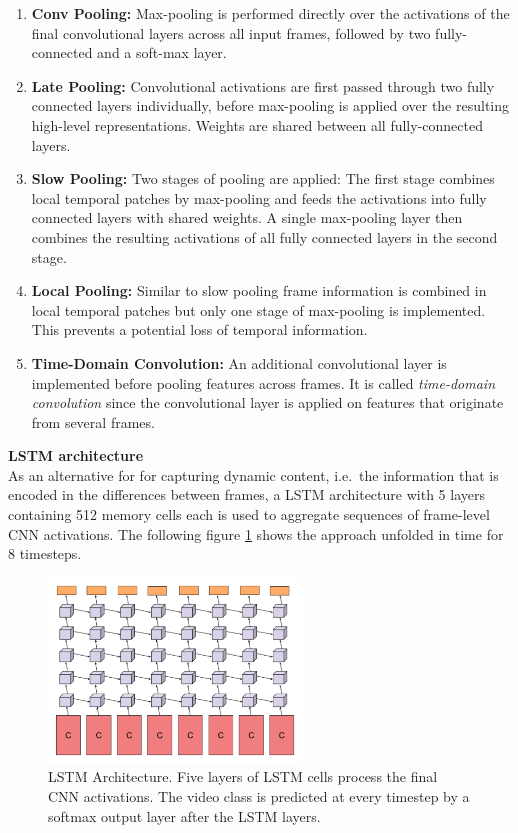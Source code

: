 \begin{enumerate}[label=\alph*)]
\item \textbf{Conv Pooling:} Max-pooling is performed directly over the activations of the final convolutional layers across all input frames, followed by two fully-connected and a soft-max layer.
\item \textbf{Late Pooling:} Convolutional activations are first passed through two fully connected layers individually, before max-pooling is applied over the resulting high-level representations. Weights are shared between all fully-connected layers.
\item \textbf{Slow Pooling:} Two stages of pooling are applied: The first stage combines local temporal patches by max-pooling and feeds the activations into fully connected layers with shared weights. A single max-pooling layer then combines the resulting activations of all fully connected layers in the second stage.
\item \textbf{Local Pooling:} Similar to slow pooling frame information is combined in local temporal patches but only one stage of max-pooling is implemented. This prevents a potential loss of temporal information.
\item \textbf{Time-Domain Convolution:} An additional convolutional layer is implemented before pooling features across frames. It is called \textit{time-domain convolution} since the convolutional layer is applied on features that originate from several frames.
\end{enumerate}

\textbf{LSTM architecture}\\
As an alternative for for capturing dynamic content, i.e.\ the information that is encoded in the differences between frames, a LSTM architecture \cite{hochreiter_long_1997} with 5 layers containing 512 memory cells each is used to aggregate sequences of frame-level CNN activations.
The following figure \ref{fig:beyondshort_lstmarchitecture} shows the approach unfolded in time for 8 timesteps.

\begin{figure}[H]
    \centering
    \includegraphics[width=0.6\textwidth]{img_deep/beyondshort_lstmarchitecture}
    \caption{LSTM Architecture. Five layers of LSTM cells process the final CNN activations. The video class is predicted at every timestep by a softmax output layer after the LSTM layers. \cite{ng_beyond_2015}}
    \label{fig:beyondshort_lstmarchitecture}
\end{figure}

